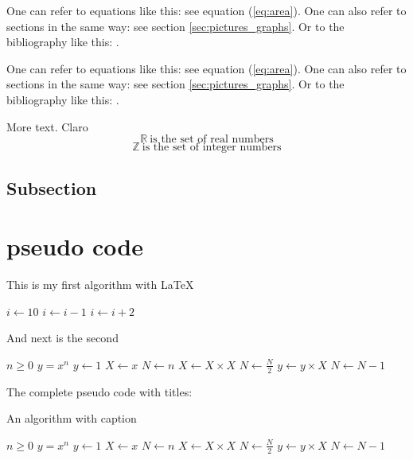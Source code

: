 \documentclass[12pt,a4paper]{article}
\theoremstyle{definition}
\theoremstyle{remark}
\def\RR{\mathbb{R}}
\def\ZZ{\mathbb{Z}}
\begin{document}
One can refer to equations like this: see equation (\ref{eq:area}). One can also
refer to sections in the same way: see section \ref{sec:pictures_graphs}. Or
to the bibliography like this: \cite{Cd94}.

One can refer to equations like this: see equation (\ref{eq:area}). One can also
refer to sections in the same way: see section \ref{sec:pictures_graphs}. Or
to the bibliography like this: \cite{Cd94}.

More text. Claro 
\[\RR\ \text{is the set of real numbers}\]
\[\ZZ\ \text{is the set of integer numbers}\]



\subsection{Subsection}\label{sec:nothing}

\section{pseudo code}\label{sec:pseudo_code}

This is my first algorithm with \LaTeX

\begin{algorithmic}[1]
\State $i \gets 10$
    \State $i \gets i-1$
\Else
        \State $i \gets i+2$
    \EndIf
\EndIf 
\end{algorithmic}

\bigskip 
And next is the second
\begin{algorithmic}
\Require $n \geq 0$
\Ensure $y = x^n$
\State $y \gets 1$
\State $X \gets x$
\State $N \gets n$
    \State $X \gets X \times X$
    \State $N \gets \frac{N}{2}$  
    \State $y \gets y \times X$
    \State $N \gets N - 1$
\EndIf
\EndWhile
\end{algorithmic}



The complete pseudo code with titles:

\begin{algorithm}
\caption{An algorithm with caption}\label{alg:cap}
\begin{algorithmic}[1]
\Require $n \geq 0$
\Ensure $y = x^n$
\State $y \gets 1$
\State $X \gets x$
\State $N \gets n$
    \State $X \gets X \times X$
    \State $N \gets \frac{N}{2}$  
    \State $y \gets y \times X$
    \State $N \gets N - 1$
\EndIf
\EndWhile
\end{algorithmic}
\end{algorithm}
\end{document}
